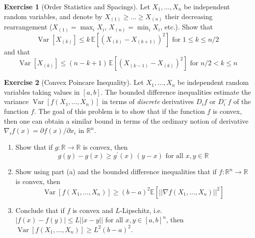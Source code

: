 \documentclass{article}
\DeclareMathOperator{\Var}{Var}
\theoremstyle{definition}
\newtheorem{exercise}{Exercise}[section]
\theoremstyle{remark}
\theoremstyle{definition}
\begin{document}
\begin{exercise}[Order Statistics and Spacings]
Let $X_1, \ldots, X_n$ be independent random variables, and denote by $X_{(1)} \geq \ldots \geq X_{(n)}$ their decreasing rearrangement ($X_{(1)} = \max_i X_i$, $X_{(n)} = \min_i X_i$, etc.). Show that 
\[\Var[X_{(k)}] \leq k \, \mathbb{E}[(X_{(k)} - X_{(k+1)})^2] \text{ for } 1 \leq k \leq n/2\]
and that 
\[\Var[X_{(k)}] \leq (n - k + 1)\, \mathbb{E}[(X_{(k-1)} - X_{(k)})^2] \text{ for } n/2 < k \leq n\]
\end{exercise}

\begin{exercise}[Convex Poincare Inequality]
Let $X_1, \ldots, X_n$ be independent random variables taking values in $[a, b]$. The bounded difference inequalities estimate the variance $\Var[f(X_1, \ldots, X_n)]$ in terms of \textit{discrete} derivatives $D_i f$ or $D_i^- f$ of the function $f$. The goal of this problem is to show that if the function $f$ is convex, then one can obtain a similar bound in terms of the ordinary notion of derivative $\nabla_i f(x) = \partial f(x)/\partial x_i$ in $\mathbb{R}^n$. 
\begin{enumerate}
    \item Show that if $g: \mathbb{R} \longrightarrow \mathbb{R}$ is convex, then 
    \[g(y) - g(x) \geq g^\prime (x)\, (y - x) \text{ for all } x, y \in \mathbb{R}\]
    
    \item Show using part (a) and the bounded difference inequalities that if $f: \mathbb{R}^n \rightarrow \mathbb{R}$ is convex, then 
    \[\Var[f(X_1, \ldots, X_n)] \geq (b - a)^2 \mathbb{E}[ ||\nabla f (X_1, \ldots, X_n)||^2]\]
    
    \item Conclude that if $f$ is convex and $L$-Lipschitz, i.e. $|f(x) - f(y)| \leq L ||x - y||$ for all $x, y \in [a, b]^n$, then $\Var[f(X_1, \ldots, X_n)] \geq L^2 (b - a)^2$. 
\end{enumerate}
\end{exercise}
\end{document}
